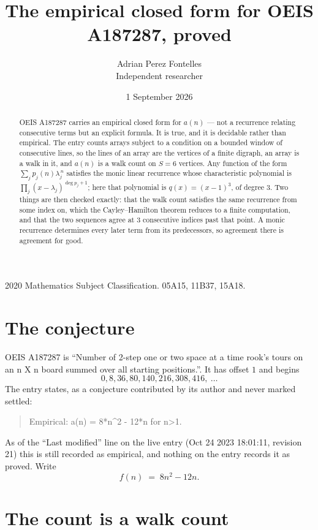 \documentclass[11pt,a4paper]{article}
\title{The empirical closed form for OEIS A187287, proved}
\author{Adrian Perez Fontelles\\ \small Independent researcher}
\date{1 September 2026}
\theoremstyle{plain}
\theoremstyle{definition}
\begin{document}
\maketitle

\begin{abstract}
OEIS A187287 carries an empirical closed form for $a(n)$ --- not a recurrence relating
consecutive terms but an explicit formula. It is true, and it is decidable rather than
empirical. The entry counts arrays subject to a condition on a bounded window of consecutive lines, so the lines of an array are the
vertices of a finite digraph, an array is a walk in it, and $a(n)$ is a walk count on
$S=6$ vertices. Any function of the form $\sum_j p_j(n)\lambda_j^{\,n}$ satisfies the
monic linear recurrence whose characteristic polynomial is
$\prod_j(x-\lambda_j)^{\deg p_j+1}$; here that polynomial is $q(x)=(x-1)^{3}$, of degree
$3$. Two things are then checked exactly: that the walk count satisfies the same
recurrence from some index on, which the Cayley--Hamilton theorem reduces to a finite
computation, and that the two sequences agree at $3$ consecutive indices past that
point. A monic recurrence determines every later term from its predecessors, so agreement
there is agreement for good.
\end{abstract}

\noindent\small 2020 Mathematics Subject Classification. 05A15, 11B37, 15A18.\normalsize

\section{The conjecture}

OEIS A187287 is ``Number of 2-step one or two space at a time rook's tours on an n X n board summed over all starting positions.''. It has offset $1$ and begins
\[
0, 8, 36, 80, 140, 216, 308, 416,\ \dots
\]
The entry states, as a conjecture contributed by its author and never marked settled:
\begin{quote}
Empirical: a(n) = 8*n\^{}2 - 12*n for n>1.
\end{quote}
As of the ``Last modified'' line on the live entry (Oct 24 2023 18:01:11, revision 21) this is still
recorded as empirical, and nothing on the entry records it as proved. Write
\[
f(n)\;=\;8 n^{2} - 12 n.
\]

\section{The count is a walk count}
\end{document}

